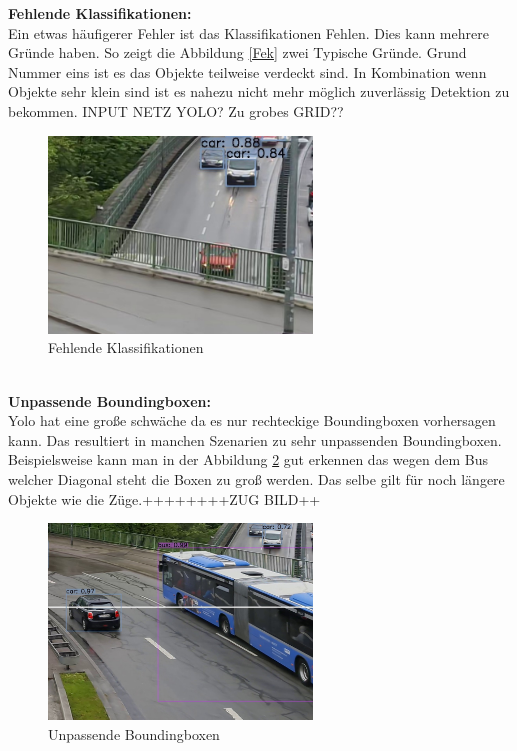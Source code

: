 \documentclass[conference]{IEEEtran}
\begin{document}
	\textbf{Fehlende Klassifikationen:}\\
	Ein etwas häufigerer Fehler ist das Klassifikationen Fehlen. Dies kann mehrere Gründe haben. So zeigt die Abbildung \ref{Fek} zwei Typische Gründe. Grund Nummer eins ist es das Objekte teilweise verdeckt sind. In Kombination wenn Objekte sehr klein sind ist es nahezu nicht mehr möglich zuverlässig Detektion zu bekommen. INPUT NETZ YOLO? Zu grobes GRID?? 
	\begin{figure}[!h]
		\begin{center}
			\includegraphics[width=7cm]{Media/Output_680 - Kopie.jpg}
			\caption{Fehlende Klassifikationen}
			\label{FeK}
		\end{center}
	\end{figure}\\
	\textbf{Unpassende Boundingboxen:}\\
	Yolo hat eine große schwäche da es nur rechteckige Boundingboxen vorhersagen kann. Das resultiert in manchen Szenarien zu sehr unpassenden Boundingboxen. Beispielsweise kann man in der Abbildung \ref{UB} gut erkennen das wegen dem Bus welcher Diagonal steht die Boxen zu groß werden. Das selbe gilt für noch längere Objekte wie die Züge.++++++++ZUG BILD++
	\begin{figure}[!h]
		\begin{center}
			\includegraphics[width=7cm]{Media/Output_777 - Kopie.jpg}
			\caption{Unpassende Boundingboxen}
			\label{UB}
		\end{center}
	\end{figure}\\
	
\end{document}
